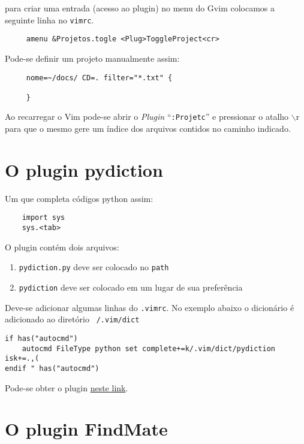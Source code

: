 para criar uma entrada (acesso ao plugin) no menu do Gvim colocamos
a seguinte linha no {\tt vimrc}.

\begin{verbatim}
     amenu &Projetos.togle <Plug>ToggleProject<cr>
\end{verbatim}

Pode-se definir um projeto manualmente assim:

\begin{verbatim}
     nome=~/docs/ CD=. filter="*.txt" {

     }
\end{verbatim}

Ao recarregar o Vim pode-se abrir o {\em Plugin} ``{\tt :Projetc}'' e 
pressionar o atalho $\backslash$r para que o mesmo gere um índice dos arquivos
contidos no caminho indicado.
   

\section{O plugin pydiction}
\label{sec:O plugin pydiction}

Um que completa códigos python assim:

\begin{verbatim}
    import sys
    sys.<tab>
\end{verbatim}

O plugin contém dois arquivos:

\begin{enumerate}
    \item {\tt pydiction.py} deve ser colocado no {\tt path}
    \item {\tt pydiction} deve ser colocado em um lugar de sua preferência
\end{enumerate}

Deve-se adicionar algumas linhas do {\tt .vimrc}.
No exemplo abaixo o dicionário é adicionado ao diretório {\tt ~/.vim/dict}
\begin{verbatim}
if has("autocmd")
    autocmd FileType python set complete+=k/.vim/dict/pydiction isk+=.,(
endif " has("autocmd") 
\end{verbatim}

Pode-se obter o plugin  \href{http://www.vim.org/scripts/script.php?script\_id=850}{neste link}.

\section{O plugin FindMate}
\label{sec:O plugin FindMate}

